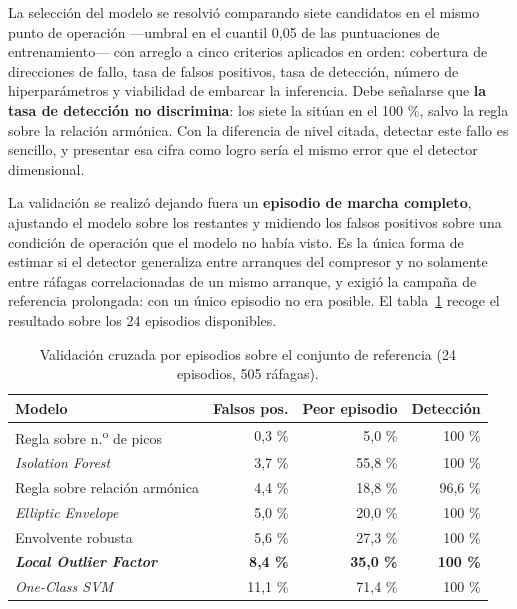 La selección del modelo se resolvió comparando siete candidatos en el mismo punto de operación
—umbral en el cuantil 0,05 de las puntuaciones de entrenamiento— con arreglo a cinco criterios
aplicados en orden: cobertura de direcciones de fallo, tasa de falsos positivos, tasa de
detección, número de hiperparámetros y viabilidad de embarcar la inferencia. Debe señalarse que
\textbf{la tasa de detección no discrimina}: los siete la sitúan en el 100 \%, salvo la regla
sobre la relación armónica. Con la diferencia de nivel citada, detectar este fallo es sencillo,
y presentar esa cifra como logro sería el mismo error que el detector dimensional.

La validación se realizó dejando fuera un \textbf{episodio de marcha completo}, ajustando el
modelo sobre los restantes y midiendo los falsos positivos sobre una condición de operación que
el modelo no había visto. Es la única forma de estimar si el detector generaliza entre arranques
del compresor y no solamente entre ráfagas correlacionadas de un mismo arranque, y exigió la
campaña de referencia prolongada: con un único episodio no era posible. El
tabla~\ref{table:validacion-episodios} recoge el resultado sobre los 24 episodios disponibles.

\begin{table}[ht!]
\caption{Validación cruzada por episodios sobre el conjunto de referencia (24 episodios, 505 ráfagas).}
\label{table:validacion-episodios}
\centering
\begin{tabular}{|p{4.6cm}|r|r|r|}
\hline
\textbf{Modelo} & \textbf{Falsos pos.} & \textbf{Peor episodio} & \textbf{Detección} \\
\hline
Regla sobre n.\textsuperscript{o} de picos & 0,3 \% & 5,0 \% & 100 \% \\
\hline
\textit{Isolation Forest} & 3,7 \% & 55,8 \% & 100 \% \\
\hline
Regla sobre relación armónica & 4,4 \% & 18,8 \% & 96,6 \% \\
\hline
\textit{Elliptic Envelope} & 5,0 \% & 20,0 \% & 100 \% \\
\hline
Envolvente robusta & 5,6 \% & 27,3 \% & 100 \% \\
\hline
\textbf{\textit{Local Outlier Factor}} & \textbf{8,4 \%} & \textbf{35,0 \%} & \textbf{100 \%} \\
\hline
\textit{One-Class SVM} & 11,1 \% & 71,4 \% & 100 \% \\
\hline
\end{tabular}
\end{table}

